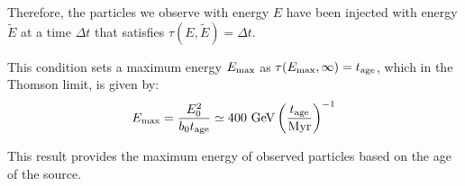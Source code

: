 Therefore, the particles we observe with energy $E$ have been injected with energy $\tilde{E}$ at a time $\Delta t$ that satisfies $\tau(E, \tilde{E}) = \Delta t$.
 
This condition sets a maximum energy $E_{\rm max}$ as $\tau(E_{\rm max}, \infty) = t_{\rm age}$, which in the Thomson limit, is given by:
%
\begin{equation}
E_{\rm max} = \frac{E_0^2}{b_0 t_{\rm age}} \simeq 400~{\rm GeV} \left( \frac{t_{\rm age}}{\rm Myr} \right)^{-1}
\end{equation}

This result provides the maximum energy of observed particles based on the age of the source.
